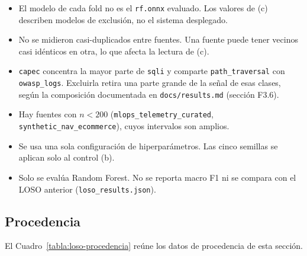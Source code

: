 \begin{itemize}
\item El modelo de cada fold no es el \texttt{rf.onnx} evaluado. Los valores de (c) describen modelos de exclusión, no el sistema desplegado.
\item No se midieron casi-duplicados entre fuentes. Una fuente puede tener vecinos casi idénticos en otra, lo que afecta la lectura de (c).
\item \texttt{capec} concentra la mayor parte de \texttt{sqli} y comparte \texttt{path\_traversal} con \texttt{owasp\_logs}. Excluirla retira una parte grande de la señal de esas clases, según la composición documentada en \texttt{docs/results.md} (sección F3.6).
\item Hay fuentes con $n < 200$ (\texttt{mlops\_telemetry\_curated}, \texttt{synthetic\_nav\_ecommerce}), cuyos intervalos son amplios.
\item Se usa una sola configuración de hiperparámetros. Las cinco semillas se aplican solo al control (b).
\item Solo se evalúa Random Forest. No se reporta macro F1 ni se compara con el LOSO anterior (\texttt{loso\_results.json}).
\end{itemize}

\subsection{Procedencia}\label{anexo:loso-procedencia}
El Cuadro~\ref{tabla:loso-procedencia} reúne los datos de procedencia de esta sección.


